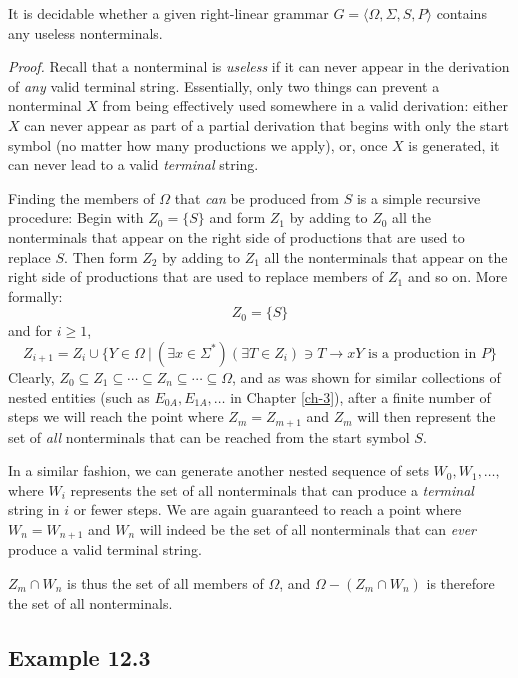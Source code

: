 \begin{thm}\label{thm-12.6}
It is decidable whether a given right-linear grammar $G=\langle\Omega,\Sigma,S,
P\rangle$ contains any useless nonterminals.

\emph{Proof.} Recall that a nonterminal is \emph{useless} if it can never appear
in the derivation of \emph{any} valid terminal string. Essentially, only two things can
prevent a nonterminal $X$ from being effectively used somewhere in a valid
derivation: either $X$ can never appear as part of a partial derivation that
begins with only the start symbol (no matter how many productions we apply), or,
once $X$ is generated, it can never lead to a valid \emph{terminal} string.

Finding the members of $\Omega$ that \emph{can} be produced from $S$ is a simple
recursive procedure: Begin with $Z_0=\{S\}$ and form $Z_1$ by adding to $Z_0$
all the nonterminals that appear on the right side of productions that are used
to replace $S$. Then form $Z_2$ by adding to $Z_1$ all the nonterminals that
appear on the right side of productions that are used to replace members of $Z_1$
and so on. More formally:
\[ Z_0 = \{S\} \]
and for $i \geq 1$,
\[ Z_{i+1} = Z_i\cup\{Y\in\Omega\ |\ (\exists x\in\Sigma^*)(\exists T\in Z_i)\ni T
	\rightarrow xY\text{ is a production in }P\} \]
Clearly, $Z_0\subseteq Z_1\subseteq\cdots\subseteq Z_n\subseteq\cdots\subseteq
\Omega$, and as was shown for similar collections of nested entities (such as
$E_{0A},E_{1A},\ldots$ in Chapter \ref{ch-3}), after a finite number of steps we
will reach the point where $Z_m=Z_{m+1}$ and $Z_m$ will then represent the set
of \emph{all} nonterminals that can be reached from the start symbol $S$.

In a similar fashion, we can generate another nested sequence of sets $W_0,W_1,
\ldots,$ where $W_i$ represents the set of all nonterminals that can produce
a \emph{terminal} string in $i$ or fewer steps. We are again guaranteed to reach
a point where $W_n=W_{n+1}$ and $W_n$ will indeed be the set of all nonterminals
that can \emph{ever} produce a valid terminal string.

$Z_m\cap W_n$ is thus the set of all \emph{} members of $\Omega$, and
$\Omega -(Z_m\cap W_n)$ is therefore the set of all  nonterminals.
\end{thm}

\subsection*{Example 12.3}\label{ex-12.3}

